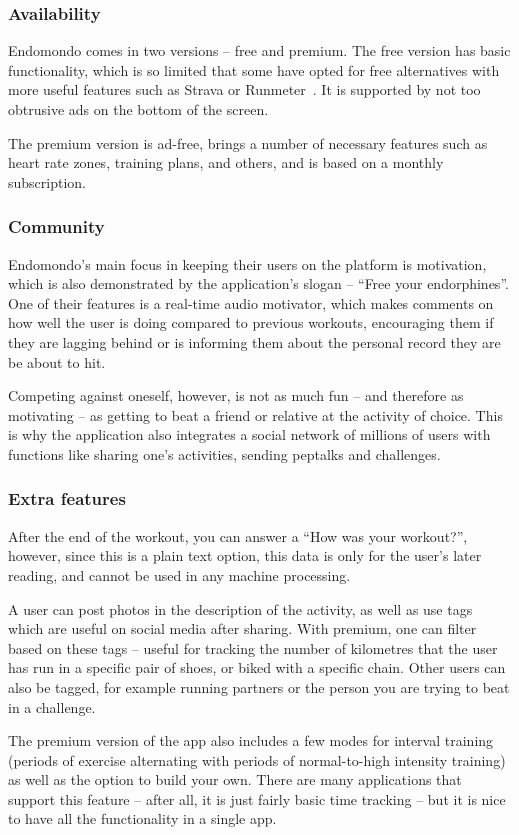 \subsubsection*{Availability}
Endomondo comes in two versions -- free and premium.
The free version has basic functionality, which is so limited that some have opted for free alternatives with more useful features such as Strava or Runmeter~\cite{endomondo-review}.
It is supported by not too obtrusive ads on the bottom of the screen.

The premium version is ad-free, brings a number of necessary features such as heart rate zones, training plans, and others, and is based on a monthly subscription.
\subsubsection*{Community}
Endomondo's main focus in keeping their users on the platform is motivation, which is also demonstrated by the application's slogan -- ``Free your endorphines''.
One of their features is a real-time audio motivator, which makes comments on how well the user is doing compared to previous workouts,
encouraging them if they are lagging behind or is informing them about the personal record they are be about to hit.

Competing against oneself, however, is not as much fun -- and therefore as motivating -- as getting to beat a friend or relative at the activity of choice.
This is why the application also integrates a social network of millions of users with functions like sharing one's activities, sending peptalks and challenges.
\subsubsection*{Extra features}
After the end of the workout, you can answer a ``How was your workout?'', however, since this is a plain text option, this data is only for the user's later reading, and cannot be used in any machine processing.

A user can post photos in the description of the activity, as well as use tags which are useful on social media after sharing.
With premium, one can filter based on these tags -- useful for tracking the number of kilometres that the user has run in a specific pair of shoes, or biked with a specific chain.
Other users can also be tagged, for example running partners or the person you are trying to beat in a challenge.

The premium version of the app also includes a few modes for interval training (periods of exercise alternating with periods of normal-to-high intensity training) as well as the option to build your own.
There are many applications that support this feature -- after all, it is just fairly basic time tracking -- but it is nice to have all the functionality in a single app.
